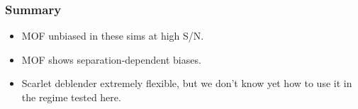 \documentclass{beamer}
\begin{document}
\frame
{
    \frametitle{Summary}

    \begin{itemize}
        \item MOF unbiased in these sims at high S/N.

        \item MOF shows separation-dependent biases.

        \item Scarlet deblender extremely flexible, but we don't know
            yet how to use it in the regime tested here.

    \end{itemize}

}
\end{document}
